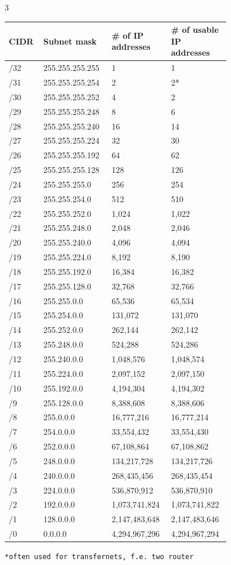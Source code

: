 \documentclass[10pt,landscape]{article}
\begin{document}
\begin{multicols}{3}
\begin{tabular}{|p{0.1\linewidth}| p{0.25\linewidth}| p{0.2\linewidth} | p{0.2\linewidth}| }
\hline
\textbf{CIDR} & \textbf{Subnet mask} & \textbf{\# of IP addresses} & \textbf{\# of usable IP addresses} \\
\hline
/32 & 255.255.255.255 & 1 & 1 \\
/31 & 255.255.255.254 & 2 & 2* \\
/30 & 255.255.255.252 & 4 & 2 \\
/29 & 255.255.255.248 & 8 & 6 \\
/28 & 255.255.255.240 & 16 & 14 \\
/27 & 255.255.255.224 & 32 & 30 \\
/26 & 255.255.255.192 & 64 & 62 \\
/25 & 255.255.255.128 & 128 & 126 \\
/24 & 255.255.255.0 & 256 & 254 \\
/23 & 255.255.254.0 & 512 & 510 \\
/22 & 255.255.252.0 & 1,024 & 1,022 \\
/21 & 255.255.248.0 & 2,048 & 2,046 \\
/20 & 255.255.240.0 & 4,096 & 4,094 \\
/19 & 255.255.224.0 & 8,192 & 8,190 \\
/18 & 255.255.192.0 & 16,384 & 16,382 \\
/17 & 255.255.128.0 & 32,768 & 32,766 \\
/16 & 255.255.0.0 & 65,536 & 65,534 \\
/15 & 255.254.0.0 & 131,072 & 131,070 \\
/14 & 255.252.0.0 & 262,144 & 262,142 \\
/13 & 255.248.0.0 & 524,288 & 524,286 \\
/12 & 255.240.0.0 & 1,048,576 & 1,048,574 \\
/11 & 255.224.0.0 & 2,097,152 & 2,097,150 \\
/10 & 255.192.0.0 & 4,194,304 & 4,194,302 \\
/9 & 255.128.0.0 & 8,388,608 & 8,388,606 \\
/8 & 255.0.0.0 & 16,777,216 & 16,777,214 \\
/7 & 254.0.0.0 & 33,554,432 & 33,554,430 \\
/6 & 252.0.0.0 & 67,108,864 & 67,108,862 \\
/5 & 248.0.0.0 & 134,217,728 & 134,217,726 \\
/4 & 240.0.0.0 & 268,435,456 & 268,435,454 \\
/3 & 224.0.0.0 & 536,870,912 & 536,870,910 \\
/2 & 192.0.0.0 & 1,073,741,824 & 1,073,741,822 \\
/1 & 128.0.0.0 & 2,147,483,648 & 2,147,483,646 \\
/0 & 0.0.0.0 & 4,294,967,296 & 4,294,967,294 \\
\hline
\end{tabular}
\texttt{*often used for transfernets, f.e. two router}  





\end{multicols}
\end{document}
